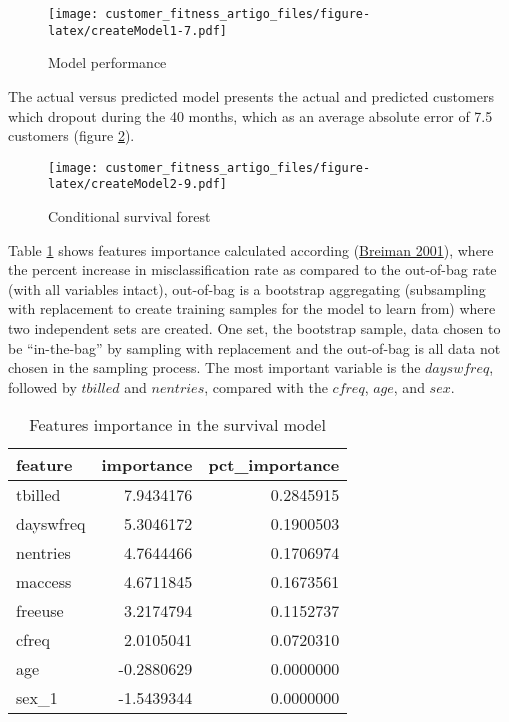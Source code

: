 \documentclass[
  12pt,
]{article}
\begin{document}
\begin{figure}
\centering
\texttt{[image: customer\_fitness\_artigo\_files/figure-latex/createModel1-7.pdf]}
\caption{\label{fig:createModel1}Model performance}
\end{figure}

The actual versus predicted model presents the actual and predicted customers which dropout
during the 40 months, which as an average absolute error of 7.5 customers (figure \ref{fig:createModel2}).

\begin{figure}
\centering
\texttt{[image: customer\_fitness\_artigo\_files/figure-latex/createModel2-9.pdf]}
\caption{\label{fig:createModel2}Conditional survival forest}
\end{figure}

Table \ref{tab:summarytable2} shows features importance calculated according (\protect\hyperlink{ref-Breiman_2001}{Breiman 2001}),
where the percent increase in misclassification rate as compared to the out-of-bag rate (with all
variables intact), out-of-bag is a bootstrap aggregating (subsampling with replacement to create
training samples for the model to learn from) where two independent sets are created.
One set, the bootstrap sample, data chosen to be ``in-the-bag'' by sampling with replacement and the
out-of-bag is all data not chosen in the sampling process.
The most important variable is the \(dayswfreq\), followed by \(tbilled\) and
\(nentries\), compared with the \(cfreq\), \(age\), and \(sex\).

\begin{table}

\caption{\label{tab:summarytable2}Features importance in the survival model}
\centering
\begin{tabular}[t]{lrr}
\toprule
feature & importance & pct\_importance\\
\midrule
tbilled & 7.9434176 & 0.2845915\\
dayswfreq & 5.3046172 & 0.1900503\\
nentries & 4.7644466 & 0.1706974\\
maccess & 4.6711845 & 0.1673561\\
freeuse & 3.2174794 & 0.1152737\\
\addlinespace
cfreq & 2.0105041 & 0.0720310\\
age & -0.2880629 & 0.0000000\\
sex\_1 & -1.5439344 & 0.0000000\\
\bottomrule
\end{tabular}
\end{table}
\end{document}
